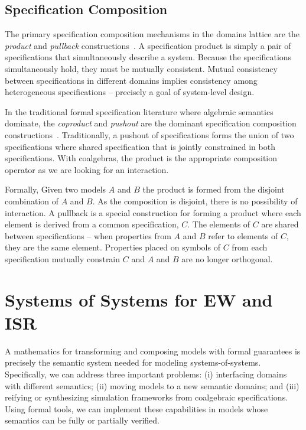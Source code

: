 \documentclass[12pt]{article}
\begin{document}
\subsection{Specification Composition}

The primary specification composition mechanisms in the domains lattice are the
\emph{product} and \emph{pullback} constructions~\cite{Ehrig:85:Fundamentals-of}.  A
specification product is simply a pair of specifications that simultaneously describe a
system.  Because the specifications simultaneously hold, they must be mutually consistent.
Mutual consistency between specifications in different domains implies consistency among
heterogeneous specifications -- precisely a goal of system-level design.

In the traditional formal specification literature where algebraic semantics dominate, the
\emph{coproduct} and \emph{pushout} are the dominant specification composition
constructions~\cite{Ehrig:85:Fundamentals-of,Smith:93:Constructing-Sp,Smith:90:KIDS:-A-Semiaut}.
Traditionally, a pushout of specifications forms the union of two specifications where
shared specification that is jointly constrained in both specifications.  With coalgebras,
the product is the appropriate composition operator as we are looking for an interaction.

Formally, Given two models $A$ and $B$ the product is formed from the disjoint combination
of $A$ and $B$.  As the composition is disjoint, there is no possibility of interaction.
A pullback is a special construction for forming a product where each element is derived
from a common specification, $C$.  The elements of $C$ are shared between specifications
-- when properties from $A$ and $B$ refer to elements of $C$, they are the same element.
Properties placed on symbols of $C$ from each specification mutually constrain $C$ and $A$
and $B$ are no longer orthogonal.

\section{Systems of Systems for EW and ISR}

A mathematics for transforming and composing models with formal guarantees is precisely
the semantic system needed for modeling systems-of-systems.  Specifically, we can address
three important problems: (i) interfacing domains with different semantics; (ii) moving
models to a new semantic domains; and (iii) reifying or synthesizing simulation frameworks
from coalgebraic specifications.  Using formal tools, we can implement these capabilities
in models whose semantics can be fully or partially verified.
\end{document}
